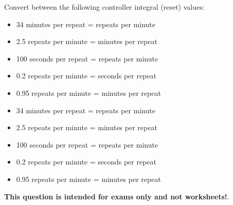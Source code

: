 

Convert between the following controller integral (reset) values:

\vskip 10pt

\begin{itemize}
\item{} 34 minutes per repeat = \underbar{\hskip 50pt} repeats per minute
\vskip 5pt
\item{} 2.5 repeats per minute = \underbar{\hskip 50pt} minutes per repeat
\vskip 5pt
\item{} 100 seconds per repeat = \underbar{\hskip 50pt} repeats per minute
\vskip 5pt
\item{} 0.2 repeats per minute = \underbar{\hskip 50pt} seconds per repeat
\vskip 5pt
\item{} 0.95 repeats per minute = \underbar{\hskip 50pt} minutes per repeat
\end{itemize}







\begin{itemize}
\item{} 34 minutes per repeat =  repeats per minute
\item{} 2.5 repeats per minute =  minutes per repeat
\item{} 100 seconds per repeat =  repeats per minute
\item{} 0.2 repeats per minute =  seconds per repeat
\item{} 0.95 repeats per minute =  minutes per repeat
\end{itemize}







{\bf This question is intended for exams only and not worksheets!}.




